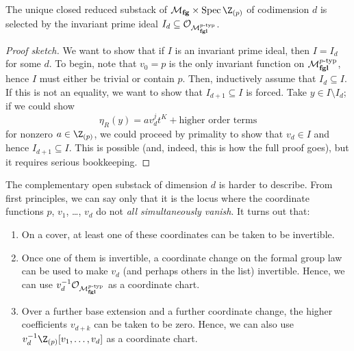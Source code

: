 \begin{theorem}\label{LandwebersClassificationOfClosedSubstacks}
The unique closed reduced substack of $\moduli{fg} \times \Spec \Z_{(p)}$ of codimension $d$ is selected by the invariant prime ideal $I_d \subseteq \mathcal{O}_{\mathcal{M}_{\mathbf{fgl}}^{p\text{-}\mathrm{typ}}}$.
\end{theorem}
\begin{proof}[Proof sketch]
We want to show that if $I$ is an invariant prime ideal, then $I = I_d$ for some $d$.  To begin, note that $v_0 = p$ is the only invariant function on $\mathcal{M}_{\mathbf{fgl}}^{p\text{-}\mathrm{typ}}$, hence $I$ must either be trivial or contain $p$.  Then, inductively assume that $I_d \subseteq I$.  If this is not an equality, we want to show that $I_{d+1} \subseteq I$ is forced.  Take $y \in I \setminus I_d$; if we could show \[\eta_R(y) = a v_d^j t^K + \text{higher order terms}\] for nonzero $a \in \Z_{(p)}$, we could proceed by primality to show that $v_d \in I$ and hence $I_{d+1} \subseteq I$.  This is possible (and, indeed, this is how the full proof goes), but it requires serious bookkeeping.
\end{proof}

\begin{remark}\label{OpenSubstacksOfMfg}
The complementary open substack of dimension $d$ is harder to describe.%
From first principles, we can say only that it is the locus where the coordinate functions $p$, $v_1$, \ldots, $v_d$ do not \emph{all simultaneously vanish}.  It turns out that:
\begin{enumerate}
\item On a cover, at least one of these coordinates can be taken to be invertible.\item Once one of them is invertible, a coordinate change on the formal group law can be used to make $v_d$ (and perhaps others in the list) invertible.  Hence, we can use $v_d^{-1} \mathcal{O}_{\mathcal{M}_{\mathbf{fgl}}^{p\text{-}\mathrm{typ}}}$ as a coordinate chart.
\item Over a further base extension and a further coordinate change, the higher coefficients $v_{d+k}$ can be taken to be zero.  Hence, we can also use $v_d^{-1} \Z_{(p)}[v_1, \ldots, v_d]$ as a coordinate chart.
\end{enumerate}
\end{remark}

